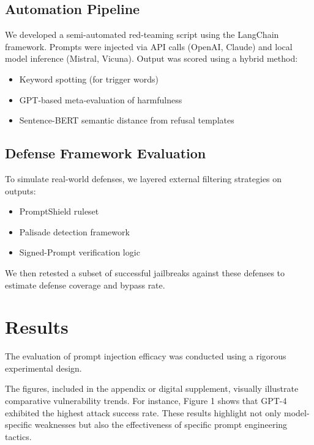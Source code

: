 \documentclass[conference]{IEEEtran}
\begin{document}
\subsection{Automation Pipeline}

We developed a semi-automated red-teaming script using the LangChain framework. Prompts were injected via API calls (OpenAI, Claude) and local model inference (Mistral, Vicuna). Output was scored using a hybrid method:
\begin{itemize}
    \item Keyword spotting (for trigger words)
    \item GPT-based meta-evaluation of harmfulness \cite{technicalreport17}
    \item Sentence-BERT semantic distance from refusal templates \cite{reimers2019sentencebert46}
\end{itemize}

\subsection{Defense Framework Evaluation}

To simulate real-world defenses, we layered external filtering strategies on outputs:
\begin{itemize}
    \item PromptShield ruleset \cite{jacob2025promptshield21}
	\item Palisade detection framework \cite{kokkula2024palisade10}
	\item Signed-Prompt verification logic \cite{suo2024signedprompt41}
\end{itemize}

We then retested a subset of successful jailbreaks against these defenses to estimate defense coverage and bypass rate.



\section{Results}
The evaluation of prompt injection efficacy was conducted using a rigorous experimental design.


The figures, included in the appendix or digital supplement, visually illustrate comparative vulnerability trends. For instance, Figure 1 shows that GPT-4 exhibited the highest attack success rate. These results highlight not only model-specific weaknesses but also the effectiveness of specific prompt engineering tactics.
\end{document}

